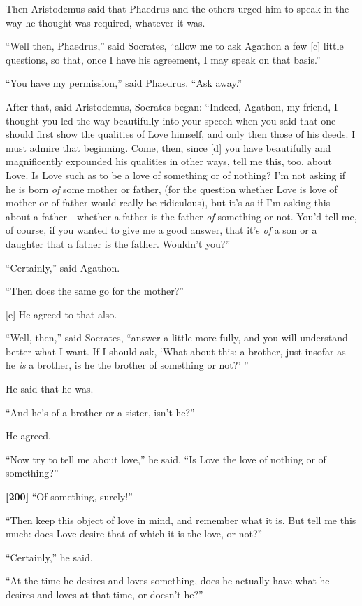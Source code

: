 Then Aristodemus said that Phaedrus and the others urged him to speak in
the way he thought was required, whatever it was.

“Well then, Phaedrus,” said Socrates, “allow me to ask Agathon a few
{[}c{]} little questions, so that, once I have his agreement, I may
speak on that basis.”

“You have my permission,” said Phaedrus. “Ask away.”

After that, said Aristodemus, Socrates began: “Indeed, Agathon, my
friend, I thought you led the way beautifully into your speech when you
said that one should first show the qualities of Love himself, and only
then those of his deeds. I must admire that beginning. Come, then, since
{[}d{]} you have beautifully and magnificently expounded his qualities
in other ways, tell me this, too, about Love. Is Love such as to be a
love of something or of nothing? I'm not asking if he is born {\em of}
some mother or father, (for the question whether Love is love of mother
or of father would really be ridiculous), but it's as if I'm asking this
about a father---whether a father is the father {\em of} something or
not. You'd tell me, of course, if you wanted to give me a good answer,
that it's {\em of} a son or a daughter that a father is the father.
Wouldn't you?”

“Certainly,” said Agathon.

“Then does the same go for the mother?”

{[}e{]} He agreed to that also.

“Well, then,” said Socrates, “answer a little more fully, and you will
understand better what I want. If I should ask, ‘What about this: a
brother, just insofar as he {\em is} a brother, is he the brother of
something or not?' ”

He said that he was.

“And he's of a brother or a sister, isn't he?”

He agreed.

“Now try to tell me about love,” he said. “Is Love the love of nothing
or of something?”

{\bf {[}200{]}} “Of something, surely!”

“Then keep this object of love in mind, and remember what it
is. But tell me this
much: does Love desire that of which it is the love, or not?”

“Certainly,” he said.

“At the time he desires and loves something, does he actually have what
he desires and loves at that time, or doesn't he?”

